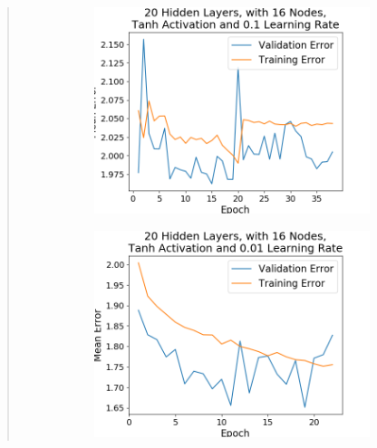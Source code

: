 \documentclass{article}
\begin{document}
\begin{quote}
\begin{figure}[h!]
	\centering
	\begin{subfigure}[h]{0.23\textwidth}
		\includegraphics[width=\textwidth]{figs/Emotions_Multiclass_Classification_20_Hidden_Layers_with_16_Nodes_Tanh_Activation_and_0.1_Learning_Rate.png}
	\end{subfigure}
	\begin{subfigure}[h]{0.23\textwidth}
		\includegraphics[width=\textwidth]{figs/Emotions_Multiclass_Classification_20_Hidden_Layers_with_16_Nodes_Tanh_Activation_and_0.01_Learning_Rate.png}
	\end{subfigure}
	\begin{subfigure}[h]{0.23\textwidth}

\end{subfigure}
\end{figure}
\end{quote}
\end{document}

